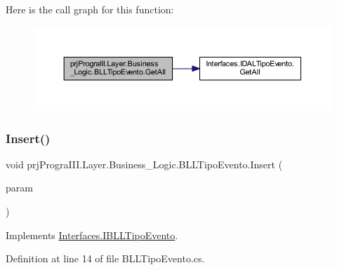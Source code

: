 Here is the call graph for this function\+:
\nopagebreak
\begin{figure}[H]
\begin{center}
\leavevmode
\includegraphics[width=350pt]{classprj_progra_i_i_i_1_1_layer_1_1_business___logic_1_1_b_l_l_tipo_evento_a37e2d53e8cc54bfcdd0f3a89caad53cc_cgraph}
\end{center}
\end{figure}
\hypertarget{classprj_progra_i_i_i_1_1_layer_1_1_business___logic_1_1_b_l_l_tipo_evento_a3edf9ef41a8df3294c6765b55338a750}{}\label{classprj_progra_i_i_i_1_1_layer_1_1_business___logic_1_1_b_l_l_tipo_evento_a3edf9ef41a8df3294c6765b55338a750} 
\subsubsection{\texorpdfstring{Insert()}{Insert()}}
{\footnotesize\ttfamily void prj\+Progra\+I\+I\+I.\+Layer.\+Business\+\_\+\+Logic.\+B\+L\+L\+Tipo\+Evento.\+Insert (\begin{DoxyParamCaption}\item[{\hyperlink{classprj_progra_i_i_i_1_1_layer_1_1_entities_1_1_tipo_evento}{Tipo\+Evento}}]{param }\end{DoxyParamCaption})}



Implements \hyperlink{interface_interfaces_1_1_i_b_l_l_tipo_evento_abe3b18cdc875d0c08853478dd9720af4}{Interfaces.\+I\+B\+L\+L\+Tipo\+Evento}.



Definition at line 14 of file B\+L\+L\+Tipo\+Evento.\+cs.

